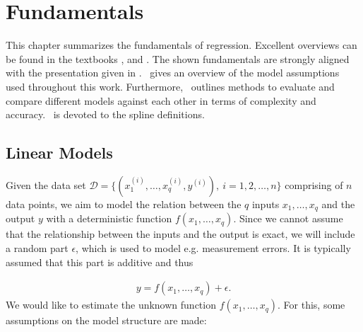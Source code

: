 
\chapter{Fundamentals} \label{cha:fundamentals}

This chapter summarizes the fundamentals of regression. Excellent overviews can be found in the textbooks \cite{fahrmeir2007regression}, \cite{friedman2001elements} and \cite{wood2017generalized}. The shown fundamentals are strongly aligned with the presentation given in \cite{fahrmeir2007regression}.~ gives an overview of the model assumptions used throughout this work. Furthermore,~ outlines methods to evaluate and compare different models against each other in terms of complexity and accuracy.~ is devoted to the  spline definitions.

\section{Linear Models} \label{sec:LinModel}

Given the data set $\mathcal{D} = \{(x^{(i)}_1, \dots, x^{(i)}_q, y^{(i)}), \ i=1,2, \dots, n\}$ comprising of $n$ data points, we aim to model the relation between the $q$ inputs $x_1, \dots, x_q$ and the output $y$ with a deterministic function $f(x_1, \dots, x_q)$. Since we cannot assume that the relationship between the inputs and the output is exact, we will include a random part $\epsilon$, which is used to model e.g. measurement errors. It is typically assumed that this part is additive and thus  

\begin{align} \label{eq:model-structure}
	y = f(x_{1}, \dots, x_{q}) + \epsilon.
\end{align}
%
We would like to estimate the unknown function $f(x_1, \dots, x_q)$. For this, some assumptions on the model structure are made:

